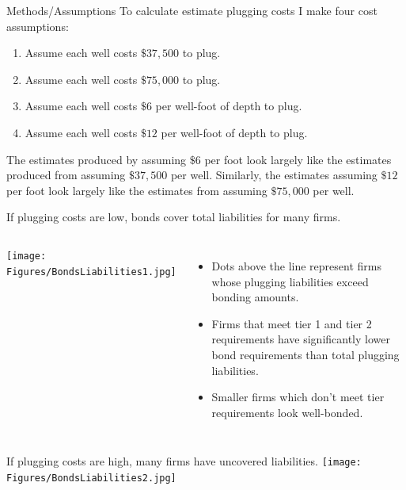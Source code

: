 \documentclass{beamer}
\begin{document}
\begin{frame}{Methods/Assumptions}
\label{costcalc}
    To calculate estimate plugging costs I make four cost assumptions:
    \begin{enumerate}
        \item Assume each well costs $\$37,500$ to plug.
        \item Assume each well costs $\$75,000$ to plug.
        \item Assume each well costs $\$6$ per well-foot of depth to plug.
        \item Assume each well costs $\$12$ per well-foot of depth to plug.
    \end{enumerate}
    \vspace{.7cm}
    The estimates produced by assuming $\$6$ per foot look largely like the estimates produced from assuming $\$37,500$ per well.  Similarly, the estimates assuming $\$12$ per foot look largely like the estimates from assuming $\$75,000$ per well.

    \hyperlink{depths}{}
\end{frame}

\begin{frame}{If plugging costs are low, bonds cover total liabilities for many firms.}
\label{Fig1}
\begin{columns}
             \centering
             \texttt{[image: Figures/BondsLiabilities1.jpg]}
              \begin{itemize}
                  \item Dots above the line represent firms whose plugging liabilities exceed bonding amounts.
                  \item Firms that meet tier 1 and tier 2 requirements have significantly lower bond requirements than total plugging liabilities.
                  \item Smaller firms which don't meet tier requirements look well-bonded.
              \end{itemize}
\end{columns} 
\vspace{1cm}
\hyperlink{Liability1Zoom}{}
\end{frame}


\begin{frame}{If plugging costs are high, many firms have uncovered liabilities.}
\label{Fig2}
\vspace{-0.5cm}
\centering
\texttt{[image: Figures/BondsLiabilities2.jpg]}

\hyperlink{Liability2Zoom}{}
    
\end{frame}
\end{document}
